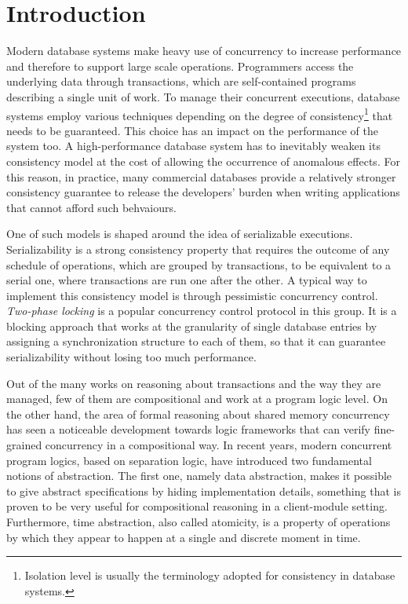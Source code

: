 \chapter{Introduction}

Modern database systems make heavy use of concurrency to increase performance and therefore to support large scale operations. Programmers access the underlying data through transactions, which are self-contained programs describing a single unit of work. To manage their concurrent executions, database systems employ various techniques depending on the degree of consistency\footnote{Isolation level is usually the terminology adopted for consistency in database systems.} that needs to be guaranteed. This choice has an impact on the performance of the system too. A high-performance database system has to inevitably weaken its consistency model at the cost of allowing the occurrence of anomalous effects. For this reason, in practice, many commercial databases provide a relatively stronger consistency guarantee to release the developers' burden when writing applications that cannot afford such behvaiours.


One of such models is shaped around the idea of serializable executions. Serializability is a strong consistency property that requires the outcome of any schedule of operations, which are grouped by transactions, to be equivalent to a serial one, where transactions are run one after the other. A typical way to implement this consistency model is through pessimistic concurrency control. \textit{Two-phase locking} is a popular concurrency control protocol in this group. It is a blocking approach that works at the granularity of single database entries by assigning a synchronization structure to each of them, so that it can guarantee serializability without losing too much performance.

Out of the many works on reasoning about transactions and the way they are managed, few of them are compositional and work at a program logic level. On the other hand, the area of formal reasoning about shared memory concurrency has seen a noticeable development towards logic frameworks that can verify fine-grained concurrency in a compositional way. In recent years, modern concurrent program logics, based on separation logic, have introduced two fundamental notions of abstraction. The first one, namely data abstraction, makes it possible to give abstract specifications by hiding implementation details, something that is proven to be very useful for compositional reasoning in a client-module setting. Furthermore, time abstraction, also called atomicity, is a property of operations by which they appear to happen at a single and discrete moment in time.

